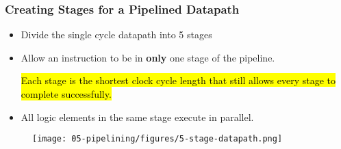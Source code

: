 

\begin{frame}\frametitle{Creating Stages for a Pipelined Datapath}
\begin{itemize}
    \item Divide the single cycle datapath into 5 stages
    \item  Allow an instruction to be in \textbf{only }one stage of the pipeline. 
    
      \hl{\tiny Each stage is the shortest clock cycle length that still allows every stage to complete successfully.}
    \item All logic elements in the same stage execute in parallel. 
\end{itemize}
\begin{figure}[H]
\centering
	{\texttt{[image: 05-pipelining/figures/5-stage-datapath.png]}}
\end{figure}

\end{frame}



